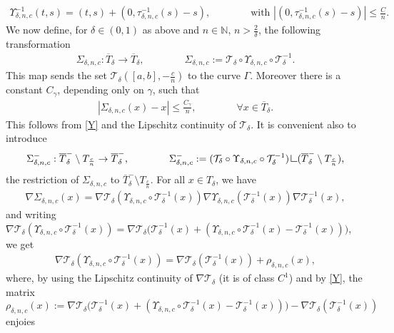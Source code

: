 \documentclass[a4paper,11pt]{article}
\numberwithin{equation}{section}
\newcommand{\res}      {\mathop{\hbox{\vrule height 7pt width .5pt depth
                        0pt\vrule height .5pt width 6pt depth 0pt}}\nolimits}
\begin{document}
\begin{align}\label{Yinverse}
\Upsilon_{\delta,n,c}^{-1}(t,s)=(t,s)+(0,\tau_{\delta,n,c}^{-1}(s)-s),\qquad \qquad\text{with } |(0,\tau_{\delta,n,c}^{-1}(s)-s)|\leq \frac{C}{n}.
\end{align}	
We now define, for  $\delta\in(0,1)$ as above and $n\in \mathbb N$, $n>\frac2\delta$, the following transformation
\begin{align}
\Sigma_{\delta,n,c}:\overline T_\delta\rightarrow\overline  T_\delta,\qquad \qquad \Sigma_{\delta,n,c}:=\mathcal T_\delta \circ \Upsilon_{\delta,n,c}\circ \mathcal T_\delta^{-1}.
\end{align}
This map sends the set $\mathcal T_\delta([a,b],-\frac cn)$ to the curve $\Gamma$. 
Moreover there is a constant $C_\gamma$, depending only on $\gamma$, such that 
\begin{align}\label{Sigma_uniform}
|\Sigma_{\delta,n,c}(x)-x|\leq \frac{C_\gamma}{n}, \qquad \qquad \forall x\in \overline T_\delta.
\end{align}
This follows from \eqref{Y} and the Lipschitz continuity of $\mathcal T_\delta$. 
It is convenient also to introduce 
\begin{align}\label{Sigma-}
\Sigma_{\delta,n,c}^-:\overline T_\delta^-\setminus T_{\frac cn}\rightarrow \overline T^-_\delta,\qquad \qquad \Sigma^-_{\delta,n,c}:=(\mathcal T_\delta \circ \Upsilon_{\delta,n,c}\circ \mathcal T_\delta^{-1})\res (\overline T^-_\delta\setminus T_{\frac cn}),
\end{align}
the restriction of $\Sigma_{\delta,n,c}$ to  $\overline T^-_\delta\setminus T_{\frac cn}$.
For all $x\in T_\delta$, we have
\begin{align}\label{nablaSigma}
\nabla \Sigma_{\delta,n,c}(x)=\nabla \mathcal T_\delta(\Upsilon_{\delta,n,c}\circ \mathcal T_\delta^{-1}(x))\nabla \Upsilon_{\delta,n,c}(\mathcal T_\delta^{-1}(x))\nabla \mathcal T_\delta^{-1}(x),
\end{align}
and writing $\nabla\mathcal T_\delta(\Upsilon_{\delta,n,c}\circ \mathcal T_\delta^{-1}(x))=\nabla\mathcal T_\delta\Big(\mathcal T_\delta^{-1}(x)+(\Upsilon_{\delta,n,c}\circ \mathcal T_\delta^{-1}(x)-\mathcal T_\delta^{-1}(x))\Big)$, we get
\begin{align}\label{335}
\nabla\mathcal T_\delta(\Upsilon_{\delta,n,c}\circ \mathcal T_\delta^{-1}(x))=\nabla\mathcal T_\delta(\mathcal T_\delta^{-1}(x))+\rho_{\delta,n,c}(x),
\end{align}
where, by using the Lipschitz continuity  of $\nabla \mathcal T_\delta$ (it is of class $C^1$) and by \eqref{Y}, the matrix $$\rho_{\delta,n,c}(x):=\nabla\mathcal T_\delta\Big(\mathcal T_\delta^{-1}(x)+(\Upsilon_{\delta,n,c}\circ \mathcal T_\delta^{-1}(x)-\mathcal T_\delta^{-1}(x))\Big)-\nabla\mathcal T_\delta(\mathcal T_\delta^{-1}(x))$$ enjoies
\end{document}

